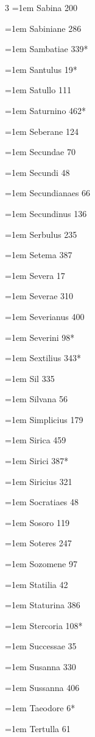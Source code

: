 \begin{multicols}{3}
\hangindent=1em Sabina 200\par
\hangindent=1em Sabiniane 286\par
\hangindent=1em Sambatiae 339*\par
\hangindent=1em Santulus 19*\par
\hangindent=1em Satullo 111\par
\hangindent=1em Saturnino 462*\par
\hangindent=1em Seberane 124\par
\hangindent=1em Secundae 70\par
\hangindent=1em Secundi 48\par
\hangindent=1em Secundianaes 66\par
\hangindent=1em Secundinus 136\par
\hangindent=1em Serbulus 235\par
\hangindent=1em Setema 387\par
\hangindent=1em Severa 17\par
\hangindent=1em Severae 310\par
\hangindent=1em Severianus 400\par
\hangindent=1em Severini 98*\par
\hangindent=1em Sextilius 343*\par
\hangindent=1em Sil 335\par
\hangindent=1em Silvana 56\par
\hangindent=1em Simplicius 179\par
\hangindent=1em Sirica 459\par
\hangindent=1em Sirici 387*\par
\hangindent=1em Siricius 321\par
\hangindent=1em Socratiaes 48\par
\hangindent=1em Sosoro 119\par
\hangindent=1em Soteres 247\par
\hangindent=1em Sozomene 97\par
\hangindent=1em Statilia 42\par
\hangindent=1em Staturina 386\par
\hangindent=1em Stercoria 108*\par
\hangindent=1em Successae 35\par
\hangindent=1em Susanna 330\par
\hangindent=1em Sussanna 406\par
\hangindent=1em Taeodore 6*\par
\hangindent=1em Tertulla 61\par

\end{multicols}
